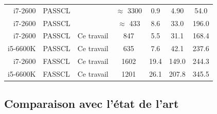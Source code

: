 \begin{table}[t]
{{\begin{tabular}{r|l|c|c|c c c}
        \hline
        i7-2600  & PASSCL & \cite{sarkis_increasing_2014}    & $\approx$ 3300                 & 0.9             & 4.90            & 54.0            \\
        i7-2600  & PASSCL & \cite{sarkis_fast_2016}          & $\approx$ 433                  & 8.6             & 33.0            & 196.0           \\
        i7-2600  & PASSCL & Ce travail                       & 847                            & 5.5             & 31.1            & 168.4           \\
        i5-6600K & PASSCL & Ce travail                       & 635                            & 7.6             & 42.1            & 237.6           \\
        \hline
        i7-2600  & FASSCL & Ce travail                       & 1602                           & 19.4            & 149.0           & 244.3           \\
        i5-6600K & FASSCL & Ce travail                       & 1201                           & 26.1            & 207.8           & 345.5           \\
      \end{tabular}
      }}
    \end{table}

\subsection{Comparaison avec l'état de l'art}

